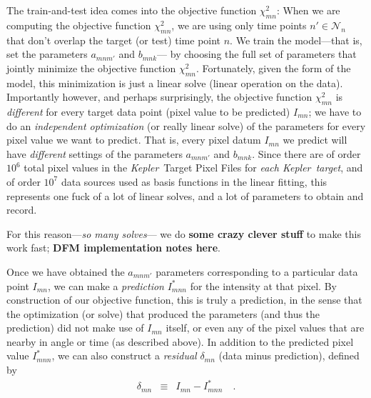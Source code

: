 \documentclass[12pt, preprint]{aastex}
\newcommand{\project}[1]{\textsl{#1}}
\newcommand{\Kepler}{\project{Kepler}}
\newcommand{\set}[1]{\mathcal{#1}}
\newcommand{\todo}[1]{\textbf{#1}}
\begin{document}
The train-and-test idea comes into the objective function $\chi^2_{mn}$:
When we are computing the objective function $\chi^2_{mn}$,
  we are using only time points $n'\in\set{N}_n$ that don't overlap the target (or test) time point $n$.
We train the model---that is, set the parameters $a_{mnm'}$ and $b_{mnk}$---%
  by choosing the full set of parameters that jointly minimize the objective function $\chi^2_{mn}$.
Fortunately, given the form of the model,
  this minimization is just a linear solve (linear operation on the data).
Importantly however, and perhaps surprisingly, the objective function $\chi^2_{mn}$ is \emph{different}
  for every target data point (pixel value to be predicted) $I_{mn}$;
  we have to do an \emph{independent optimization} (or really linear solve)
  of the parameters for every pixel value we want to predict.
That is, every pixel datum $I_{mn}$ we predict will have
  \emph{different} settings of the parameters $a_{mnm'}$ and $b_{mnk}$.
Since there are of order $10^{6}$ total pixel values in the \Kepler\ Target Pixel Files for \emph{each \Kepler\ target},
  and of order $10^7$ data sources used as basis functions in the linear fitting,
  this represents one fuck of a lot of linear solves,
  and a lot of parameters to obtain and record.

For this reason---\emph{so many solves}---%
  we do \todo{some crazy clever stuff} to make this work fast;
  \todo{DFM implementation notes here}.

Once we have obtained the $a_{mnm'}$ parameters corresponding to a particular data point $I_{mn}$,
  we can make a \emph{prediction} $I^{\ast}_{mnn}$ for the intensity at that pixel.
By construction of our objective function, this is truly a prediction,
  in the sense that the optimization (or solve) that produced the parameters
  (and thus the prediction)
  did not make use of $I_{mn}$ itself,
  or even any of the pixel values that are nearby in angle or time
  (as described above).
In addition to the predicted pixel value $I^{\ast}_{mnn}$,
  we can also construct a \emph{residual} $\delta_{mn}$ (data minus prediction),
  defined by
\begin{eqnarray}
\delta_{mn} &\equiv& I_{mn} - I^{\ast}_{mnn}
\quad .
\end{eqnarray}
\end{document}
